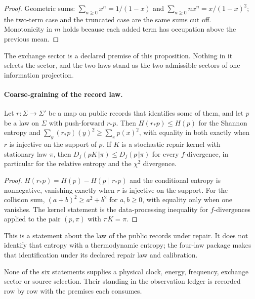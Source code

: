 \begin{proof}
Geometric sums: \(\sum_{n\ge0}x^n=1/(1-x)\) and
\(\sum_{n\ge0}nx^n=x/(1-x)^2\); the two-term case and the truncated case
are the same sums cut off. Monotonicity in \(m\) holds because each added
term has occupation above the previous mean.
\end{proof}

The exchange sector is a declared premise of this proposition. Nothing in
it selects the sector, and the two laws stand as the two admissible sectors
of one information projection.

\paragraph{Coarse-graining of the record law.}

\begin{proposition}
\label{prop:record-coarse-graining}
Let \(r\colon\Sigma\to\Sigma'\) be a map on public records that identifies
some of them, and let \(p\) be a law on \(\Sigma\) with push-forward
\(r_*p\). Then \(H(r_*p)\le H(p)\) for the Shannon entropy and
\(\sum_y(r_*p)(y)^2\ge\sum_x p(x)^2\), with equality in both exactly when
\(r\) is injective on the support of \(p\). If \(K\) is a stochastic
repair kernel with stationary law \(\pi\), then
\(D_f(pK\Vert\pi)\le D_f(p\Vert\pi)\) for every \(f\)-divergence, in
particular for the relative entropy and the \(\chi^2\) divergence.
\end{proposition}

\begin{proof}
\(H(r_*p)=H(p)-H(p\mid r_*p)\) and the conditional entropy is nonnegative,
vanishing exactly when \(r\) is injective on the support. For the collision
sum, \((a+b)^2\ge a^2+b^2\) for \(a,b\ge0\), with equality only when one
vanishes. The kernel statement is the data-processing inequality for
\(f\)-divergences applied to the pair \((p,\pi)\) with \(\pi K=\pi\).
\end{proof}

This is a statement about the law of the public records under repair. It
does not identify that entropy with a thermodynamic entropy; the four-law
package makes that identification under its declared repair law and
calibration.

None of the six statements supplies a physical clock, energy, frequency,
exchange sector or source selection. Their standing in the observation
ledger is recorded row by row with the premises each consumes.
